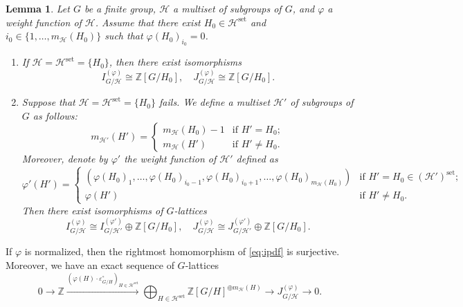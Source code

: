 \documentclass[12pt]{amsart}
\theoremstyle{plain}
\newtheorem{lem}[thm]{Lemma}
\theoremstyle{definition}
\numberwithin{thm}{section}
\numberwithin{equation}{section}
\newcommand{\Z}{\mathbb{Z}}
\newcommand{\cH}{\mathcal{H}}
\DeclareMathOperator{\set}{set}
\begin{document}
\begin{lem}\label{lem:zero}
Let $G$ be a finite group, $\cH$ a multiset of subgroups of $G$, and $\varphi$ a weight function of $\cH$. Assume that there exist $H_{0}\in \cH^{\set}$ and $i_{0}\in \{1,\ldots,m_{\cH}(H_{0})\}$ such that $\varphi(H_{0})_{i_{0}}=0$.  
\begin{enumerate}
\item If $\cH=\cH^{\set}=\{H_{0}\}$, then there exist isomorphisms
\begin{equation*}
    I_{G/\cH}^{(\varphi)}\cong \Z[G/H_{0}],\quad 
    J_{G/\cH}^{(\varphi)}\cong \Z[G/H_{0}]. 
\end{equation*}
\item Suppose that $\cH=\cH^{\set}=\{H_{0}\}$ fails. We define a multiset $\cH'$ of subgroups of $G$ as follows: 
\begin{equation*}
    m_{\cH'}(H')=
    \begin{cases}
        m_{\cH}(H_{0})-1&\text{if }H'=H_{0};\\
        m_{\cH}(H')&\text{if }H'\neq H_{0}. 
    \end{cases}
\end{equation*}
Moreover, denote by $\varphi'$ the weight function of $\cH'$ defined as
\begin{equation*}
    \varphi'(H')=
    \begin{cases}(\varphi(H_{0})_{1},\ldots,\varphi(H_{0})_{i_{0}-1},\varphi(H_{0})_{i_{0}+1},\ldots,\varphi(H_{0})_{m_{\cH}(H_{0})})&\text{if }H'=H_{0}\in (\cH')^{\set};\\
        \varphi(H')&\text{if }H'\neq H_{0}. 
    \end{cases}
\end{equation*}
Then there exist isomorphisms of $G$-lattices
\begin{equation*}
    I_{G/\cH}^{(\varphi)}\cong I_{G/\cH'}^{(\varphi')}\oplus \Z[G/H_{0}],\quad 
    J_{G/\cH}^{(\varphi)}\cong J_{G/\cH'}^{(\varphi')}\oplus \Z[G/H_{0}]. 
\end{equation*}
\end{enumerate}
\end{lem}

If $\varphi$ is normalized, then the rightmost homomorphism of \eqref{eq:ipdf} is surjective. Moreover, we have an exact sequence of $G$-lattices
\begin{equation*}
    0 \rightarrow \Z \xrightarrow{\left(\varphi(H)\cdot \varepsilon_{G/H}^{\circ}\right)_{H\in \cH^{\set}}}
    \bigoplus_{H\in \cH^{\set}}\Z[G/H]^{\oplus m_{\cH}(H)}\rightarrow 
    J_{G/\cH}^{(\varphi)}\rightarrow 0. 
\end{equation*}
\end{document}
